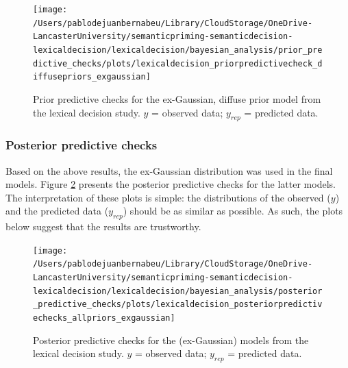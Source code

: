 \documentclass[
  12pt,
  man,floatsintext]{apa7}
\begin{document}
\begin{figure}

{\centering \texttt{[image: /Users/pablodejuanbernabeu/Library/CloudStorage/OneDrive-LancasterUniversity/semanticpriming-semanticdecision-lexicaldecision/lexicaldecision/bayesian\_analysis/prior\_predictive\_checks/plots/lexicaldecision\_priorpredictivecheck\_diffusepriors\_exgaussian]} 

}

\caption{Prior predictive checks for the ex-Gaussian, diffuse prior model from the lexical decision study. \(y\) = observed data; \(y_{rep}\) = predicted data.}\label{fig:lexicaldecision-priorpredictivecheck-diffusepriors-exgaussian}
\end{figure}

\hypertarget{posterior-predictive-checks-2}{%
\subsubsection{Posterior predictive checks}\label{posterior-predictive-checks-2}}

Based on the above results, the ex-Gaussian distribution was used in the final models. Figure \ref{fig:lexicaldecision-posteriorpredictivechecks-allpriors-exgaussian} presents the posterior predictive checks for the latter models. The interpretation of these plots is simple: the distributions of the observed (\(y\)) and the predicted data (\(y_{rep}\)) should be as similar as possible. As such, the plots below suggest that the results are trustworthy.



\begin{figure}

{\centering \texttt{[image: /Users/pablodejuanbernabeu/Library/CloudStorage/OneDrive-LancasterUniversity/semanticpriming-semanticdecision-lexicaldecision/lexicaldecision/bayesian\_analysis/posterior\_predictive\_checks/plots/lexicaldecision\_posteriorpredictivechecks\_allpriors\_exgaussian]} 

}

\caption{Posterior predictive checks for the (ex-Gaussian) models from the lexical decision study. \(y\) = observed data; \(y_{rep}\) = predicted data.}\label{fig:lexicaldecision-posteriorpredictivechecks-allpriors-exgaussian}
\end{figure}

\clearpage

\renewcommand{\thefigure}{D\arabic{figure}} \setcounter{figure}{0}
\renewcommand{\thetable}{D\arabic{table}} \setcounter{table}{0}
\end{document}
